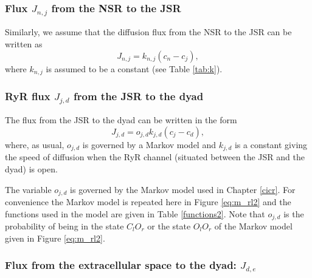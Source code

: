 \subsubsection{Flux $J_{n,j}$ from the NSR to the JSR}
Similarly, we assume that the diffusion flux from the NSR to the JSR can be written as%
\begin{equation}
J_{n,j}=k_{n,j}\left(  c_{n}-c_{j}\right), \label{J_nj}
\end{equation}
where $k_{n,j}$ is assumed to be a constant (see Table \ref{tab:k}).

\subsubsection{RyR flux $J_{j,d}$ from the JSR to the dyad}
The
flux from the JSR to the dyad can be written in the form%
\begin{equation}
J_{j,d}=o_{j,d}k_{j,d}\left(  c_{j}-c_{d}\right), \label{J_jd}
\end{equation}
where, as usual, $o_{j,d}$ is governed by a Markov model and $k_{j,d}$ is a
constant giving the speed of diffusion when the RyR channel (situated between
the JSR and the dyad) is open. 

The variable $o_{j,d}$ is governed by the Markov model 
used in Chapter \ref{cicr}. For convenience the Markov model is repeated here in Figure \ref{eq:m_rl2} and  the functions
used in the model are given in Table \ref{functions2}. Note that $o_{j,d}$ is the probability of being in the state $C_lO_r$ or the state $O_lO_r$ of the Markov model given in Figure \ref{eq:m_rl2}.





\subsubsection{Flux from the extracellular space to the dyad: $J_{d,e}$}

